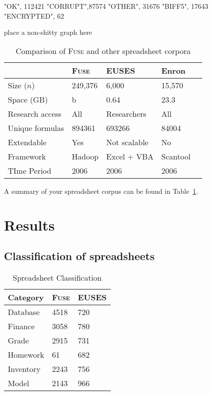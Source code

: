\documentclass[conference]{IEEEtran}
\begin{document}
"OK", 112421
"CORRUPT",87574
"OTHER", 31676 
"BIFF5",  17643 
"ENCRYPTED",  62 





place a non-shitty graph here

\begin{table}[!t]
\caption{Comparison of \textsc{Fuse} and other spreadsheet corpora\label{tab:corpora}}
\centering
\begin{tabular}{lllll}
\toprule
& \textbf{\textsc{Fuse}} & \textbf{EUSES} & \textbf{Enron}\\
\midrule
Size ($n$) & 249,376 & 6,000 & 15,570\\
Space (GB) & b & 0.64 & 23.3\\
Research access & All & Researchers & All\\
Unique formulas & 894361 & 693266 & 84004\\
Extendable & Yes & Not scalable & No\\
Framework & Hadoop & Excel + VBA & Scantool\\
TIme Period & 2006 & 2006 & 2006\\
\bottomrule
\end{tabular}
\end{table}

A summary of your spreadsheet corpus can be found in Table~\ref{tab:corpora}.

\section{Results}

\subsection{Classification of spreadsheets}


\begin{table}[!t]
\caption{Spreadsheet Classification\label{tab:ccrawl}}
\centering
\begin{tabular}{lll}
\toprule
\textbf{Category} & \textbf{\textsc{Fuse}} & \textbf{EUSES}\\
\midrule
Database & 4518 & 720\\
Finance & 3058 & 780\\
Grade & 2915 & 731\\
Homework & 61 & 682\\
Inventory & 2243 & 756\\
Model & 2143 & 966\\
\bottomrule
\end{tabular}
\end{table}
\end{document}

